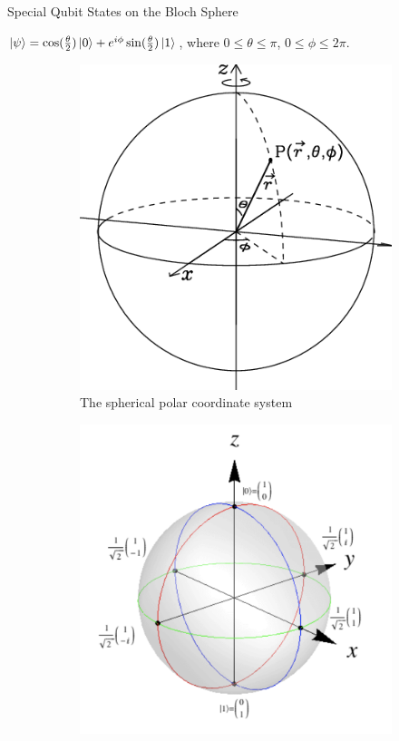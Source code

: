 \documentclass{beamer}
\begin{document}
\begin{frame}{Special Qubit States on the Bloch Sphere}
  {\tiny
  $\ket{\psi} = \cos(\frac{\theta}2)\ket{0}+e^{i\phi}\sin(\frac{\theta}2)\ket{1}$, where $0\leqslant\theta\leqslant\pi$, $0\leqslant\phi\leqslant2\pi$.
  \begin{figure}
    \centering
    \begin{subfigure}[b]{0.5\textwidth}
      \centering
      \includegraphics[scale=0.2]{figures/The-spherical-polar-coordinate-system}
      \caption{The spherical polar coordinate system\tiny\cite{sphericalpolarcoordinate}}
    \end{subfigure}
    \hfill
    \begin{subfigure}[b]{0.5\textwidth}
      \centering
      \includegraphics[scale=0.24]{figures/singlequbitstates}

\end{subfigure}
\end{figure}}
\end{frame}
\end{document}
